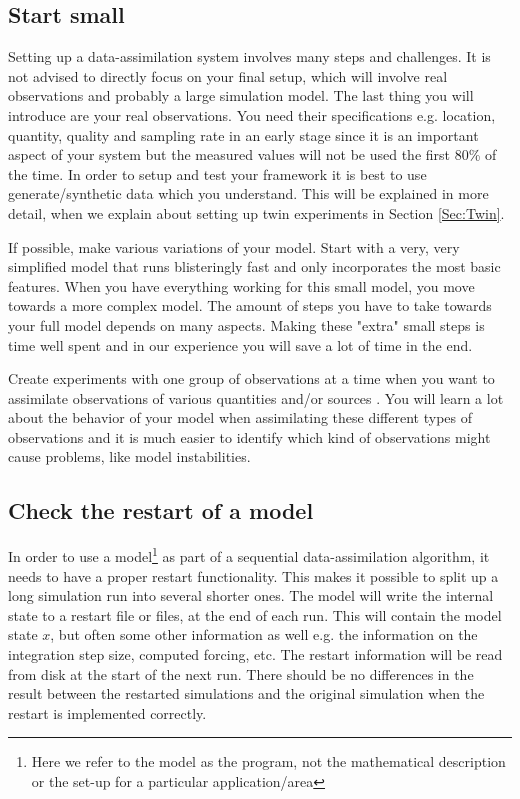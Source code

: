 \subsection{Start small}
Setting up a data-assimilation system involves many steps and challenges. It is not advised to directly focus on your final setup, which will involve real observations and probably a large simulation model. The last thing you will introduce are your real observations. You need their specifications e.g. location, quantity, quality and sampling rate in an early stage since it is an important aspect of your system but the measured values will not be used the first 80\% of the time. In order to setup and test your framework it is best to use generate/synthetic data which you understand. This will be explained in more detail, when we explain about setting up twin experiments in Section \ref{Sec:Twin}.

If possible, make various variations of your model. Start with a very, very simplified model that runs blisteringly fast and only incorporates the most basic features. When you have everything working for this small model, you move towards a more complex model. The amount of steps you have to take towards your full model depends on many aspects. Making these "extra" small steps is time well spent and in our experience you will save a lot of time in the end. 

Create experiments with one group of observations at a time when you want to assimilate observations of various quantities and/or sources . You will learn a lot about the behavior of your model when assimilating these different types of observations and it is much easier to identify which kind of observations might cause problems, like model instabilities.

\subsection{Check the restart of a model}
In order to use a model\footnote{Here we refer to the model as the program, not the mathematical description or the set-up for a particular application/area} as part of a sequential data-assimilation algorithm, it needs to have a proper restart functionality. This makes it possible to split up a long simulation run into several shorter ones. The model will write the internal state to a restart file or files, at the end of each run. This will contain the model state $x$, but often some other information as well e.g. the information on the integration step size, computed forcing, etc. The restart information will be read from disk at the start of the next run. There should be no differences in the result between the restarted simulations and the original simulation when the restart is implemented correctly. 

